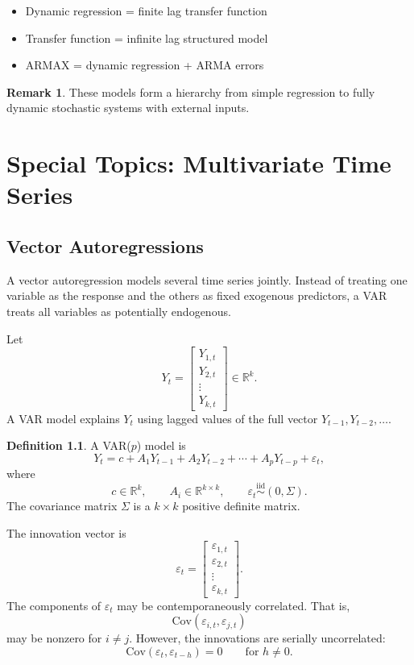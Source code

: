 \documentclass[12pt,oneside]{book}
\numberwithin{equation}{section}
\theoremstyle{definition}
\newtheorem{definition}{Definition}[section]
\newtheorem{remark}{Remark}[section]
\theoremstyle{plain}
\theoremstyle{remark}
\newcommand{\R}{\mathbb{R}}
\newcommand{\Cov}{\mathrm{Cov}}
\newcommand{\iid}{\overset{\text{iid}}{\sim}}
\begin{document}
\begin{itemize}
\item Dynamic regression = finite lag transfer function
\item Transfer function = infinite lag structured model
\item ARMAX = dynamic regression + ARMA errors
\end{itemize}

\begin{remark}
These models form a hierarchy from simple regression to fully dynamic stochastic systems with external inputs.
\end{remark}

\chapter{Special Topics: Multivariate Time Series}

\section{Vector Autoregressions}

A vector autoregression models several time series jointly. Instead of treating one variable as the response and the others as fixed exogenous predictors, a VAR treats all variables as potentially endogenous.

Let
\[
Y_t =
\begin{bmatrix}
Y_{1,t}\\
Y_{2,t}\\
\vdots\\
Y_{k,t}
\end{bmatrix}
\in \R^k.
\]
A VAR model explains $Y_t$ using lagged values of the full vector $Y_{t-1},Y_{t-2},\ldots$.

\begin{definition}
A VAR($p$) model is
\[
Y_t
=
c
+
A_1Y_{t-1}
+
A_2Y_{t-2}
+
\cdots
+
A_pY_{t-p}
+
\varepsilon_t,
\]
where
\[
c\in\R^k,
\qquad
A_i\in\R^{k\times k},
\qquad
\varepsilon_t\iid (0,\Sigma).
\]
The covariance matrix $\Sigma$ is a $k\times k$ positive definite matrix.
\end{definition}

The innovation vector is
\[
\varepsilon_t =
\begin{bmatrix}
\varepsilon_{1,t}\\
\varepsilon_{2,t}\\
\vdots\\
\varepsilon_{k,t}
\end{bmatrix}.
\]
The components of $\varepsilon_t$ may be contemporaneously correlated. That is,
\[
\Cov(\varepsilon_{i,t},\varepsilon_{j,t})
\]
may be nonzero for $i\neq j$. However, the innovations are serially uncorrelated:
\[
\Cov(\varepsilon_t,\varepsilon_{t-h})=0
\qquad
\text{for } h\neq 0.
\]
\end{document}
